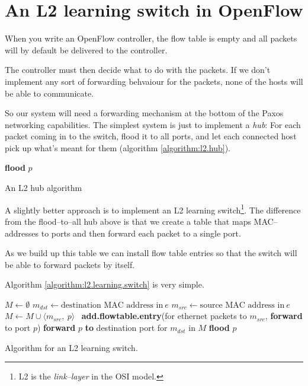 \section{An L2 learning switch in OpenFlow}

When you write an OpenFlow controller, the flow table is empty and all
packets will by default be delivered to the controller.

The controller must then decide what to do with the packets.  If we don't
implement any sort of forwarding behvaiour for the packets, none of the
hosts will be able to communicate.

So our system will need a forwarding mechanism at the bottom of the Paxos
networking capabilities.  The simplest system is just to implement a
\textit{hub}:  For each packet coming in to the switch, flood it to all
ports, and let each connected host pick up what's meant for them (algorithm
\ref{algorithm:l2.hub}).

\begin{algorithm}
  \begin{algorithmic}
      \State \textbf{flood} $p$ 
    \EndOn
  \end{algorithmic}
  \label{algorithm:l2.hub}
  \caption{An L2 hub algorithm}
\end{algorithm}

A slightly better approach is to implement an L2 learning switch\footnote{L2
is the \textit{link--layer} in the OSI model.}.  The difference from the
flood--to--all hub above is that we create a table that maps
MAC--addresses to ports and then forward each packet to a single port.

As we build up this table we can install flow table entries so that the
switch will be able to forward packets by itself.

Algorithm
\ref{algorithm:l2.learning.switch} is
very simple.

\begin{algorithm}
  \begin{algorithmic}
    \State $M \gets \emptyset$
    \State
      \State $m_{dst} \gets \text{destination MAC address in}\ e$
      \State $m_{src} \gets \text{source MAC address in}\ e$
      \State
      \State $M \gets M \cup \langle m_{src},\ p \rangle$ 
      \State
      \State \textbf{add.flowtable.entry}(for ethernet packets to
        $m_{src}$, \textbf{forward} to port $p$)
      \State
       
        \State \textbf{forward} $p$ \textbf{to} destination port for $m_{dst}$ in $M$
      \Else
        \State \textbf{flood} $p$ 
      \EndIf
    \EndOn
  \end{algorithmic}
  \label{algorithm:l2.learning.switch}
  \caption{Algorithm for an L2 learning switch.}
\end{algorithm}

